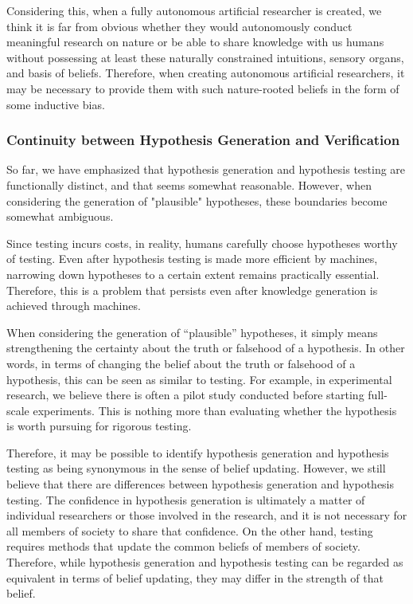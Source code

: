 \documentclass{book}
\begin{document}
Considering this, when a fully autonomous artificial researcher is created, we think it is far from obvious whether they would autonomously conduct meaningful research on nature or be able to share knowledge with us humans without possessing at least these naturally constrained intuitions, sensory organs, and basis of beliefs. Therefore, when creating autonomous artificial researchers, it may be necessary to provide them with such nature-rooted beliefs in the form of some inductive bias.

\subsubsection{Continuity between Hypothesis Generation and Verification}
So far, we have emphasized that hypothesis generation and hypothesis testing are functionally distinct, and that seems somewhat reasonable. However, when considering the generation of "plausible" hypotheses, these boundaries become somewhat ambiguous.

Since testing incurs costs, in reality, humans carefully choose hypotheses worthy of testing. Even after hypothesis testing is made more efficient by machines, narrowing down hypotheses to a certain extent remains practically essential. Therefore, this is a problem that persists even after knowledge generation is achieved through machines.

When considering the generation of ``plausible'' hypotheses, it simply means strengthening the certainty about the truth or falsehood of a hypothesis. In other words, in terms of changing the belief about the truth or falsehood of a hypothesis, this can be seen as similar to testing. For example, in experimental research, we believe there is often a pilot study conducted before starting full-scale experiments. This is nothing more than evaluating whether the hypothesis is worth pursuing for rigorous testing.

Therefore, it may be possible to identify hypothesis generation and hypothesis testing as being synonymous in the sense of belief updating. However, we still believe that there are differences between hypothesis generation and hypothesis testing. The confidence in hypothesis generation is ultimately a matter of individual researchers or those involved in the research, and it is not necessary for all members of society to share that confidence. On the other hand, testing requires methods that update the common beliefs of members of society. Therefore, while hypothesis generation and hypothesis testing can be regarded as equivalent in terms of belief updating, they may differ in the strength of that belief.
\end{document}

